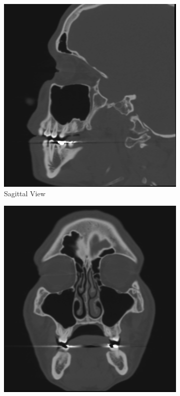 \documentclass[11.5pt, b5paper]{article}
\begin{document}
\begin{figure}
    \centering
    \begin{subfigure}[b]{0.33\textwidth}
        \centering
        \includegraphics[width=\textwidth]{NSV}
        \caption{Sagittal View}
    \end{subfigure}
    \hfill
    \begin{subfigure}[b]{0.33\textwidth}
        \centering
        \includegraphics[width=\textwidth]{NFV}

\end{subfigure}
\end{figure}
\end{document}
